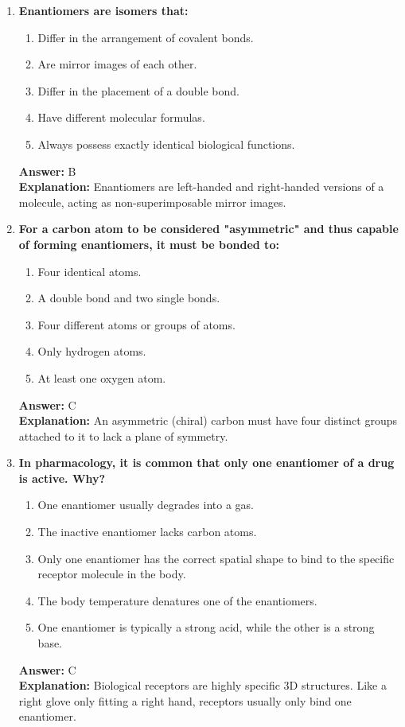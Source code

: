 \documentclass[11pt, a4paper]{article}
\begin{document}
\begin{enumerate}
\item \textbf{Enantiomers are isomers that:}
\begin{enumerate}[label=\Alph*.]
    \item Differ in the arrangement of covalent bonds.
    \item Are mirror images of each other.
    \item Differ in the placement of a double bond.
    \item Have different molecular formulas.
    \item Always possess exactly identical biological functions.
\end{enumerate}
\textbf{Answer:} B \\
\textbf{Explanation:} Enantiomers are left-handed and right-handed versions of a molecule, acting as non-superimposable mirror images.

\item \textbf{For a carbon atom to be considered "asymmetric" and thus capable of forming enantiomers, it must be bonded to:}
\begin{enumerate}[label=\Alph*.]
    \item Four identical atoms.
    \item A double bond and two single bonds.
    \item Four different atoms or groups of atoms.
    \item Only hydrogen atoms.
    \item At least one oxygen atom.
\end{enumerate}
\textbf{Answer:} C \\
\textbf{Explanation:} An asymmetric (chiral) carbon must have four distinct groups attached to it to lack a plane of symmetry.

\item \textbf{In pharmacology, it is common that only one enantiomer of a drug is active. Why?}
\begin{enumerate}[label=\Alph*.]
    \item One enantiomer usually degrades into a gas.
    \item The inactive enantiomer lacks carbon atoms.
    \item Only one enantiomer has the correct spatial shape to bind to the specific receptor molecule in the body.
    \item The body temperature denatures one of the enantiomers.
    \item One enantiomer is typically a strong acid, while the other is a strong base.
\end{enumerate}
\textbf{Answer:} C \\
\textbf{Explanation:} Biological receptors are highly specific 3D structures. Like a right glove only fitting a right hand, receptors usually only bind one enantiomer.


\end{enumerate}
\end{document}
